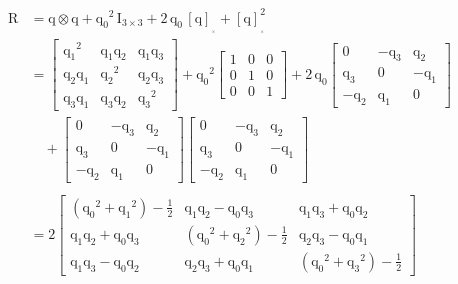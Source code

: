 \begin{align*}
	\bm{\mathrm{R}} &= \bm{\mathrm{q}}\otimes\bm{\mathrm{q}} + {\mathrm{q}_0}^2\,\bm{\mathrm{I}}_{3\times3} + 2\,\mathrm{q}_0\,[\bm{\mathrm{q}}]_{_{_\times}}\!\! + [\bm{\mathrm{q}}]_{_{_\times}}^2 \\
	&= \begin{bmatrix}
    	{\mathrm{q}_1}^2 & \mathrm{q}_1\mathrm{q}_2 & \mathrm{q}_1\mathrm{q}_3 \\
    	\mathrm{q}_2\mathrm{q}_1 & {\mathrm{q}_2}^2 & \mathrm{q}_2\mathrm{q}_3 \\
    	\mathrm{q}_3\mathrm{q}_1 & \mathrm{q}_3\mathrm{q}_2 & {\mathrm{q}_3}^2
		\end{bmatrix} 
		+ {\mathrm{q}_0}^2
		\begin{bmatrix}
    	1 & 0 & 0 \\
    	0 & 1 & 0 \\
    	0 & 0 & 1
		\end{bmatrix}
		+
		2\,\mathrm{q}_0 \begin{bmatrix}
    	0 & -\mathrm{q}_3 & \mathrm{q}_2 \\
    	\mathrm{q}_3 & 0 & -\mathrm{q}_1 \\
    	-\mathrm{q}_2 & \mathrm{q}_1 & 0
		\end{bmatrix} \\
		&\quad+
		\begin{bmatrix}
    	0 & -\mathrm{q}_3 & \mathrm{q}_2 \\
    	\mathrm{q}_3 & 0 & -\mathrm{q}_1 \\
    	-\mathrm{q}_2 & \mathrm{q}_1 & 0
		\end{bmatrix}
		\begin{bmatrix}
    	0 & -\mathrm{q}_3 & \mathrm{q}_2 \\
    	\mathrm{q}_3 & 0 & -\mathrm{q}_1 \\
    	-\mathrm{q}_2 & \mathrm{q}_1 & 0
		\end{bmatrix} \\\\
		&=2
		\begin{bmatrix}
    	({\mathrm{q}_0}^2+{\mathrm{q}_1}^2)-\frac{1}{2} & \mathrm{q}_1\mathrm{q}_2-\mathrm{q}_0\mathrm{q}_3 & \mathrm{q}_1\mathrm{q}_3+\mathrm{q}_0\mathrm{q}_2 \\
    	\mathrm{q}_1\mathrm{q}_2+\mathrm{q}_0\mathrm{q}_3 & ({\mathrm{q}_0}^2+{\mathrm{q}_2}^2)-\frac{1}{2} & \mathrm{q}_2\mathrm{q}_3-\mathrm{q}_0\mathrm{q}_1 \\
    	\mathrm{q}_1\mathrm{q}_3-\mathrm{q}_0\mathrm{q}_2 & \mathrm{q}_2\mathrm{q}_3+\mathrm{q}_0\mathrm{q}_1 & ({\mathrm{q}_0}^2+{\mathrm{q}_3}^2)-\frac{1}{2}
		\end{bmatrix}
\end{align*} 

